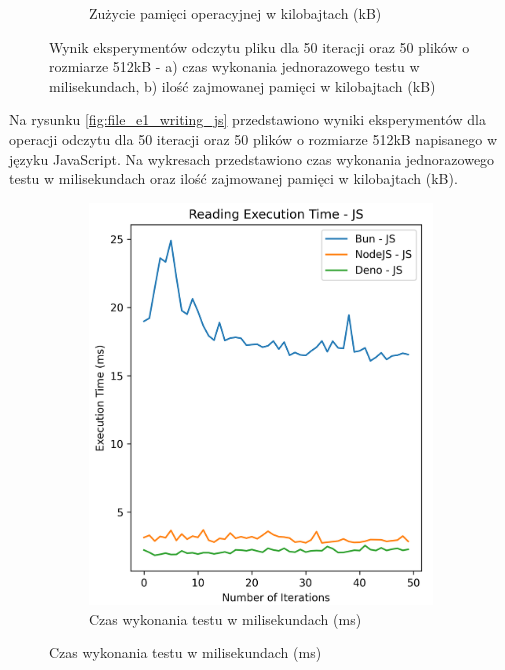 \begin{figure}[H]
\begin{subfigure}[b]{0.42\textwidth}
    \caption{Zużycie pamięci operacyjnej w kilobajtach (kB)}
    \label{fig:file_e1_reading_js_memory}
  \end{subfigure}
  \caption{Wynik eksperymentów odczytu pliku dla 50 iteracji oraz 50 plików o rozmiarze 512kB - a) czas wykonania jednorazowego testu w milisekundach, b) ilość zajmowanej pamięci w kilobajtach (kB)}
  \label{fig:file_e1_reading_js}
\end{figure}

Na rysunku \ref{fig:file_e1_writing_js} przedstawiono wyniki eksperymentów dla operacji odczytu dla 50 iteracji oraz 50 plików o rozmiarze 512kB napisanego w języku JavaScript. Na wykresach przedstawiono czas wykonania jednorazowego testu w milisekundach oraz ilość zajmowanej pamięci w kilobajtach (kB).

\begin{figure}[H]
  \centering
  \begin{subfigure}[b]{0.42\textwidth}
    \centering
    \includegraphics[width=\textwidth]{Figures/files/files_writing_50_500_50_js_time.png}
    \caption{Czas wykonania testu w milisekundach (ms)}
    \label{fig:file_e1_writing_js_time}
  \end{subfigure}

\end{figure}
